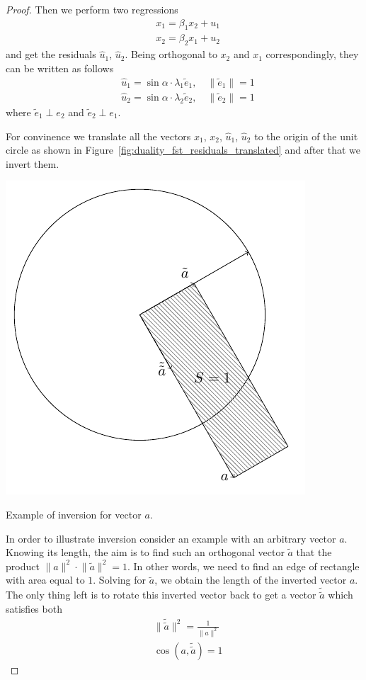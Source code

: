 \begin{proof}
Then we perform two regressions
\begin{align*}
&x_1 = \beta_1 x_2 + u_1 \\
&x_2 = \beta_2 x_1 + u_2
\end{align*}
and get the residuals $\hat{u}_1$, $\hat{u}_2$.
Being orthogonal to $x_2$ and $x_1$ correspondingly, they can be written as follows
\begin{align*}
&\hat{u}_1 = \sin \alpha \cdot \lambda_1 \tilde{e}_1, \quad \lVert \tilde{e}_1 \rVert = 1 \\
&\hat{u}_2 = \sin \alpha \cdot \lambda_2 \tilde{e}_2, \quad \lVert \tilde{e}_2 \rVert = 1
\end{align*}
where $\tilde{e}_1 \perp e_2$ and $\tilde{e}_2 \perp e_1$.

For convinence we translate all the vectors $x_1$, $x_2$, $\hat{u}_1$, $\hat{u}_2$
to the origin of the unit circle as shown in Figure~\ref{fig:duality_fst_residuals_translated}
and after that we invert them.

\begin{marginfigure}
\includegraphics[scale=0.7]{figures/02_duality_inversion.pdf}
\label{fig:duality_inversion}
\caption{Example of inversion for vector $a$.}
\end{marginfigure}

In order to illustrate inversion consider an example with an arbitrary vector $a$.
Knowing its length, the aim is to find such an orthogonal vector $\tilde a$
that the product $\lVert a \rVert^2 \cdot \lVert \tilde a \rVert^2 = 1$.
In other words, we need to find an edge of rectangle with area equal to $1$.
Solving for $\tilde a$, we obtain the length of the inverted vector $a$.
The only thing left is to rotate this inverted vector back
to get a vector $\tilde{\tilde a}$ which satisfies both
\begin{align*}
& \lVert \tilde{\tilde a} \rVert^2 = \frac{1}{\lVert a \rVert^2} \\
& \cos(a, \tilde{\tilde a}) = 1
\end{align*}


\end{proof}
